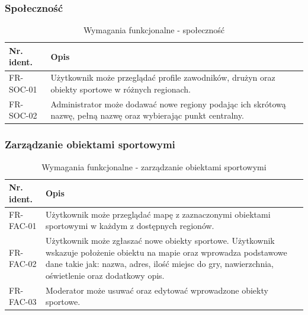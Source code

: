 \subsubsection{Społeczność}


\begin{table}[H]
\centering\small
\caption{Wymagania funkcjonalne - społeczność}
\label{tab:szablon}
\begin{tabularx}{\linewidth}{|p{.2\linewidth}|X|}\hline
Nr. ident. & Opis \\ \hline\hline

FR-SOC-01 & Użytkownik może przeglądać profile zawodników, drużyn oraz obiekty sportowe w różnych regionach.\\ \hline

FR-SOC-02 & Administrator może dodawać nowe regiony podając ich skrótową nazwę, pełną nazwę oraz wybierając punkt centralny.\\ \hline


\end{tabularx}
\end{table}

\subsubsection{Zarządzanie obiektami sportowymi}

\begin{table}[H]
\centering\small
\caption{Wymagania funkcjonalne - zarządzanie obiektami sportowymi}
\label{tab:szablon}
\begin{tabularx}{\linewidth}{|p{.2\linewidth}|X|}\hline
Nr. ident. & Opis \\ \hline\hline

FR-FAC-01 & Użytkownik może przeglądać mapę z zaznaczonymi obiektami sportowymi w każdym z dostępnych regionów.\\ \hline

FR-FAC-02 & Użytkownik może zgłaszać nowe obiekty sportowe. Użytkownik wskazuje położenie obiektu na mapie oraz wprowadza podstawowe dane takie jak: nazwa, adres, ilość miejsc do gry, nawierzchnia, oświetlenie oraz dodatkowy opis.\\ \hline

FR-FAC-03 & Moderator może usuwać oraz edytować wprowadzone obiekty sportowe.\\ \hline

\end{tabularx}
\end{table}

